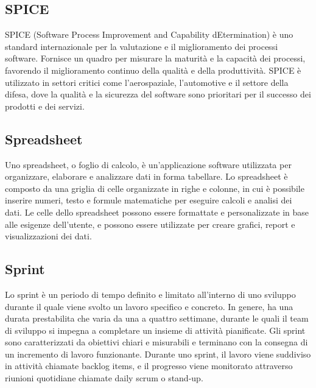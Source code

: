 \vspace{2em}
\subsection*{SPICE}
\par SPICE (Software Process Improvement and Capability dEtermination) è uno standard internazionale per la valutazione e il miglioramento dei processi software. Fornisce un quadro per misurare la maturità e la capacità dei processi, favorendo il miglioramento continuo della qualità e della produttività. SPICE è utilizzato in settori critici come l'aerospaziale, l'automotive e il settore della difesa, dove la qualità e la sicurezza del software sono prioritari per il successo dei prodotti e dei servizi.

\vspace{2em}
\subsection*{Spreadsheet}
\par Uno spreadsheet, o foglio di calcolo, è un'applicazione software utilizzata per organizzare, elaborare e analizzare dati in forma tabellare. Lo spreadsheet è composto da una griglia di celle organizzate in righe e colonne, in cui è possibile inserire numeri, testo e formule matematiche per eseguire calcoli e analisi dei dati. Le celle dello spreadsheet possono essere formattate e personalizzate in base alle esigenze dell'utente, e possono essere utilizzate per creare grafici, report e visualizzazioni dei dati.

\vspace{2em}
\subsection*{Sprint}
\par Lo sprint è un periodo di tempo definito e limitato all'interno di uno sviluppo  durante il quale viene svolto un lavoro specifico e concreto. In genere, ha una durata prestabilita che varia da una a quattro settimane, durante le quali il team di sviluppo si impegna a completare un insieme di attività pianificate. Gli sprint sono caratterizzati da obiettivi chiari e misurabili e terminano con la consegna di un incremento di lavoro funzionante. Durante uno sprint, il lavoro viene suddiviso in attività chiamate backlog items, e il progresso viene monitorato attraverso riunioni quotidiane chiamate daily scrum o stand-up.

